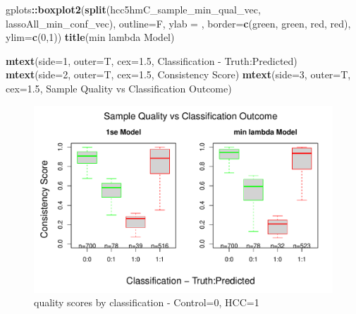 \documentclass[
]{book}
\newenvironment{Shaded}{\begin{snugshade}}{\end{snugshade}}
\newcommand{\DataTypeTok}[1]{\textcolor[rgb]{0.13,0.29,0.53}{#1}}
\newcommand{\DecValTok}[1]{\textcolor[rgb]{0.00,0.00,0.81}{#1}}
\newcommand{\FloatTok}[1]{\textcolor[rgb]{0.00,0.00,0.81}{#1}}
\newcommand{\KeywordTok}[1]{\textcolor[rgb]{0.13,0.29,0.53}{\textbf{#1}}}
\newcommand{\NormalTok}[1]{#1}
\newcommand{\OperatorTok}[1]{\textcolor[rgb]{0.81,0.36,0.00}{\textbf{#1}}}
\newcommand{\StringTok}[1]{\textcolor[rgb]{0.31,0.60,0.02}{#1}}
\begin{document}
\begin{Shaded}
\begin{Highlighting}[]
\NormalTok{gplots}\OperatorTok{::}\KeywordTok{boxplot2}\NormalTok{(}\KeywordTok{split}\NormalTok{(hcc5hmC\_sample\_min\_qual\_vec, lassoAll\_min\_conf\_vec), }
  \DataTypeTok{outline=}\NormalTok{F, }\DataTypeTok{ylab =} \StringTok{\textquotesingle{}\textquotesingle{}}\NormalTok{,}
  \DataTypeTok{border=}\KeywordTok{c}\NormalTok{(}\StringTok{\textquotesingle{}green\textquotesingle{}}\NormalTok{, }\StringTok{\textquotesingle{}green\textquotesingle{}}\NormalTok{, }\StringTok{\textquotesingle{}red\textquotesingle{}}\NormalTok{, }\StringTok{\textquotesingle{}red\textquotesingle{}}\NormalTok{),}
  \DataTypeTok{ylim=}\KeywordTok{c}\NormalTok{(}\DecValTok{0}\NormalTok{,}\DecValTok{1}\NormalTok{))}
\KeywordTok{title}\NormalTok{(}\StringTok{\textquotesingle{}min lambda Model\textquotesingle{}}\NormalTok{)}


\KeywordTok{mtext}\NormalTok{(}\DataTypeTok{side=}\DecValTok{1}\NormalTok{, }\DataTypeTok{outer=}\NormalTok{T, }\DataTypeTok{cex=}\FloatTok{1.5}\NormalTok{, }\StringTok{\textquotesingle{}Classification {-} Truth:Predicted\textquotesingle{}}\NormalTok{)}
\KeywordTok{mtext}\NormalTok{(}\DataTypeTok{side=}\DecValTok{2}\NormalTok{, }\DataTypeTok{outer=}\NormalTok{T, }\DataTypeTok{cex=}\FloatTok{1.5}\NormalTok{, }\StringTok{\textquotesingle{}Consistency Score\textquotesingle{}}\NormalTok{)}
\KeywordTok{mtext}\NormalTok{(}\DataTypeTok{side=}\DecValTok{3}\NormalTok{, }\DataTypeTok{outer=}\NormalTok{T, }\DataTypeTok{cex=}\FloatTok{1.5}\NormalTok{, }\StringTok{\textquotesingle{}Sample Quality vs Classification Outcome\textquotesingle{}}\NormalTok{)}
\end{Highlighting}
\end{Shaded}

\begin{figure}
\centering
\includegraphics{Static/figures/hcc5hmC-glmnetSuite-plot-qual-conf-1.pdf}
\caption{\label{fig:hcc5hmC-glmnetSuite-plot-qual-conf}quality scores by classification - Control=0, HCC=1}
\end{figure}
\end{document}
